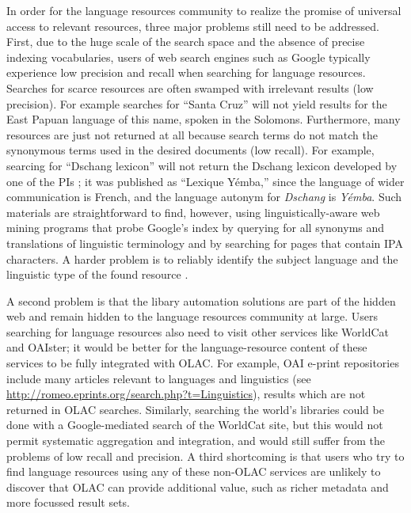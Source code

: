 In order for the language resources community to realize the promise of universal access to relevant resources, three major
problems still need to be addressed.
First, due to the huge scale of the search space and the absence
of precise indexing vocabularies,
users of web search engines such as Google typically experience
low precision and recall when searching for language resources.
Searches for scarce resources are often swamped with irrelevant
results (low precision).  For example searches for ``Santa Cruz'' will
not yield results for the East Papuan language of this name, spoken in
the Solomons.
Furthermore, many resources are just not returned at all because
search terms do not match the synonymous terms used in the desired
documents (low recall).  For example, searcing for ``Dschang lexicon''
will not return the Dschang lexicon developed by one of the PIs
\citep{BirdTadadjeu97}; it was published as ``Lexique Y\'emba,'' since
the language of wider communication is French, and the language
autonym for \textit{Dschang} is \textit{Y\'emba}.
Such materials are straightforward to find, however, using
linguistically-aware web mining programs that probe
Google's index by querying for all synonyms and translations of
linguistic terminology and by searching for pages that contain IPA characters.
A harder problem is to reliably identify the subject language and the
linguistic type of the found resource \citep{HughesBaldwin06lrec}.

A second problem is that the libary automation solutions are part of
the hidden web and remain hidden to the language resources community
at large.
Users searching for language
resources also need to visit other services like WorldCat and OAIster;
it would be better for the language-resource content
of these services to be fully integrated with OLAC.
For example, OAI e-print repositories include many articles
relevant to languages and linguistics (see
\url{http://romeo.eprints.org/search.php?t=Linguistics}),
results which are not returned in OLAC searches.
Similarly, searching the world's libraries could be done with a
Google-mediated search of the WorldCat site, but this would not
permit systematic aggregation and integration, and would still suffer
from the problems of low recall and precision.
A third shortcoming is that users who try to find language resources
using any of these non-OLAC services are unlikely to discover that
OLAC can provide additional value, such as richer metadata and more
focussed result sets.

